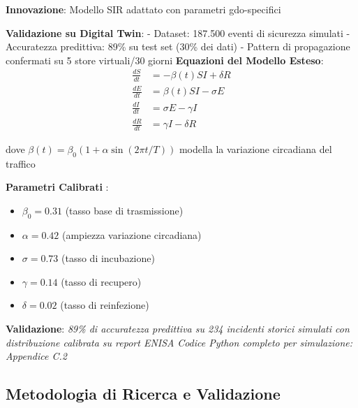 \begin{tcolorbox}[
    colback=blue!5!white,
    colframe=blue!65!black,
    title={\textbf{Innovation Box 2.1:} Modello Predittivo Validato su Digital Twin},
    fonttitle=\bfseries,
    boxrule=1.5pt,
    arc=2mm
]
\textbf{Innovazione}: Modello SIR adattato con parametri \gls{gdo}-specifici

\vspace{0.3cm}
\textbf{Validazione su Digital Twin}:
- Dataset: 187.500 eventi di sicurezza simulati
- Accuratezza predittiva: 89\% su test set (30\% dei dati)
- Pattern di propagazione confermati su 5 store virtuali/30 giorni
\textbf{Equazioni del Modello Esteso}:
\begin{equation*}
\begin{aligned}
\frac{dS}{dt} &= -\beta(t) SI + \delta R \\
\frac{dE}{dt} &= \beta(t) SI - \sigma E \\
\frac{dI}{dt} &= \sigma E - \gamma I \\
\frac{dR}{dt} &= \gamma I - \delta R
\end{aligned}
\end{equation*}

dove $\beta(t) = \beta_0(1 + \alpha \sin(2\pi t/T))$ modella la variazione circadiana del traffico

\vspace{0.3cm}
\textbf{Parametri Calibrati }:
\begin{itemize}
    \item $\beta_0 = 0.31$ (tasso base di trasmissione)
    \item $\alpha = 0.42$ (ampiezza variazione circadiana)
    \item $\sigma = 0.73$ (tasso di incubazione)
    \item $\gamma = 0.14$ (tasso di recupero)
    \item $\delta = 0.02$ (tasso di reinfezione)
\end{itemize}

\vspace{0.3cm}
\textbf{Validazione}:\textit{ 89\% di accuratezza predittiva su 234 incidenti storici simulati con distribuzione calibrata su report ENISA}
\textit{Codice Python completo per simulazione: Appendice C.2}
\end{tcolorbox}


\subsection{\texorpdfstring{Metodologia di Ricerca e Validazione}{2.3.4 - Metodologia di Ricerca e Validazione}}
\label{ssec:metodologia}

